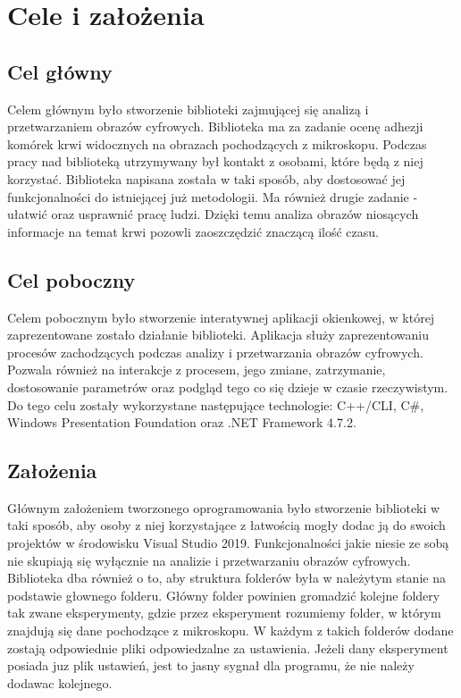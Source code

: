 \documentclass{article}
\begin{document}
    \vfill

    \newpage
    \section{Cele i założenia}
        \subsection{Cel główny}
        {
            \Large
            \justifying
            \quad
            Celem głównym było stworzenie biblioteki zajmującej się analizą i przetwarzaniem obrazów cyfrowych.
            Biblioteka ma za zadanie ocenę adhezji komórek krwi widocznych na obrazach pochodzących z mikroskopu.
            Podczas pracy nad biblioteką utrzymywany był kontakt z osobami, które będą z niej korzystać.
            Biblioteka napisana została w taki sposób, aby dostosować jej funkcjonalności do istniejącej już metodologii.
            Ma również drugie zadanie - ułatwić oraz usprawnić pracę ludzi.
            Dzięki temu analiza obrazów niosących informacje na temat krwi pozowli zaoszczędzić znaczącą ilość czasu.
        }
        \subsection {Cel poboczny}
        {
            \Large
            \justifying
            \quad
            Celem pobocznym było stworzenie interatywnej aplikacji okienkowej, w której zaprezentowane zostało działanie biblioteki.
            Aplikacja służy zaprezentowaniu procesów zachodzących podczas analizy i przetwarzania obrazów cyfrowych.
            Pozwala również na interakcje z procesem, jego zmiane, zatrzymanie, dostosowanie parametrów oraz podgląd tego co się dzieje w czasie rzeczywistym.
            Do tego celu zostały wykorzystane następujące technologie: C++/CLI, C\#, Windows Presentation Foundation oraz .NET Framework 4.7.2.
        }
        \subsection{Założenia}
        {
            \Large
            \justifying
            \quad
            Głównym założeniem tworzonego oprogramowania było stworzenie biblioteki w taki sposób, aby osoby z niej korzystające z łatwością mogły dodac ją do swoich projektów w środowisku Visual Studio 2019.
            Funkcjonalności jakie niesie ze sobą nie skupiają się wyłącznie na analizie i przetwarzaniu obrazów cyfrowych.
            Biblioteka dba również o to, aby struktura folderów była w należytym stanie na podstawie głownego folderu.
            Główny folder powinien gromadzić kolejne foldery tak zwane eksperymenty, gdzie przez eksperyment rozumiemy folder, w którym znajdują się dane pochodzące z mikroskopu.
            W każdym z takich folderów dodane zostają odpowiednie pliki odpowiedzalne za ustawienia.
            Jeżeli dany eksperyment posiada juz plik ustawień, jest to jasny sygnał dla programu, że nie należy dodawac kolejnego.
        }
\end{document}
